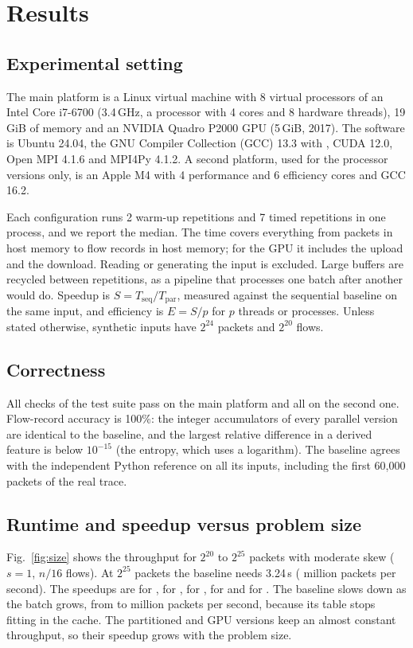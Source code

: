 \section{Results}

\subsection{Experimental setting}
The main platform is a Linux virtual machine with 8 virtual processors of an
Intel Core i7-6700 (3.4\,GHz, a processor with 4 cores and 8 hardware threads),
19\,GiB of memory and an NVIDIA Quadro P2000 GPU (5\,GiB, 2017). The software is
Ubuntu 24.04, the GNU Compiler Collection (GCC) 13.3 with , CUDA 12.0, Open MPI 4.1.6
and MPI4Py 4.1.2. A second platform, used for the processor versions only, is
an Apple M4 with 4 performance and 6 efficiency cores and GCC 16.2.

Each configuration runs 2 warm-up repetitions and 7 timed repetitions in one
process, and we report the median. The time covers everything from packets in
host memory to flow records in host memory; for the GPU it includes the upload
and the download. Reading or generating the input is excluded. Large buffers
are recycled between repetitions, as a pipeline that processes one batch after
another would do. Speedup is $S = T_{\mathrm{seq}}/T_{\mathrm{par}}$, measured
against the sequential baseline on the same input, and efficiency is $E = S/p$
for $p$ threads or processes. Unless stated otherwise, synthetic inputs have
$2^{24}$ packets and $2^{20}$ flows.

\subsection{Correctness}
All \nchecks{} checks of the test suite pass on the main platform and all
\nchecksMac{} on the second one. Flow-record accuracy is 100\%: the integer
accumulators of every parallel version are identical to the baseline, and the
largest relative difference in a derived feature is below $10^{-15}$ (the
entropy, which uses a logarithm). The baseline agrees with the independent
Python reference on all its inputs, including the first 60{,}000 packets of the
real trace.

\subsection{Runtime and speedup versus problem size}
Fig.~\ref{fig:size} shows the throughput for $2^{20}$ to $2^{25}$ packets with
moderate skew ($s=1$, $n/16$ flows). At $2^{25}$ packets the baseline needs
3.24\,s (\sizeSeqMpps{} million packets per second). The speedups are
\sizeChunkSp\x{} for , \sizePartSp\x{} for ,
\sizeAtomicSp\x{} for , \sizeFlowSp\x{} for  and
\sizeMergeSp\x{} for . The baseline slows down as the batch
grows, from \sizeSeqSmallMpps{} to \sizeSeqMpps{} million packets per second,
because its table stops fitting in the cache. The partitioned and GPU
versions keep an almost constant throughput, so their speedup grows with the
problem size.


